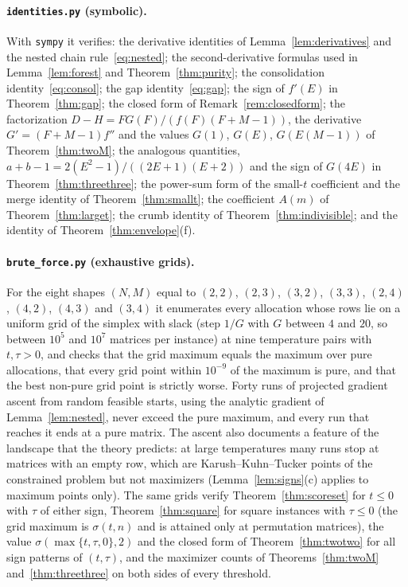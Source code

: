 \documentclass[11pt]{article}
\theoremstyle{plain}
\theoremstyle{definition}
\theoremstyle{remark}
\newcommand{\sig}{\sigma}
\begin{document}
\paragraph{\texttt{identities.py} (symbolic).}
With \texttt{sympy} it verifies: the derivative identities of Lemma~\ref{lem:derivatives} and the nested chain rule~\eqref{eq:nested}; the second-derivative formulas used in Lemma~\ref{lem:forest} and Theorem~\ref{thm:purity}; the consolidation identity~\eqref{eq:consol}; the gap identity~\eqref{eq:gap}; the sign of $f'(E)$ in Theorem~\ref{thm:gap}; the closed form of Remark~\ref{rem:closedform}; the factorization $D-H=FG(F)/(f(F)(F+M-1))$, the derivative $G'=(F+M-1)f''$ and the values $G(1)$, $G(E)$, $G(E(M-1))$ of Theorem~\ref{thm:twoM}; the analogous quantities, $a+b-1=2(E^2-1)/((2E+1)(E+2))$ and the sign of $G(4E)$ in Theorem~\ref{thm:threethree}; the power-sum form of the small-$t$ coefficient and the merge identity of Theorem~\ref{thm:smallt}; the coefficient $A(m)$ of Theorem~\ref{thm:larget}; the crumb identity of Theorem~\ref{thm:indivisible}; and the identity of Theorem~\ref{thm:envelope}(f).

\paragraph{\texttt{brute\_force.py} (exhaustive grids).}
For the eight shapes $(N,M)$ equal to $(2,2)$, $(2,3)$, $(3,2)$, $(3,3)$, $(2,4)$, $(4,2)$, $(4,3)$ and $(3,4)$ it enumerates every allocation whose rows lie on a uniform grid of the simplex with slack (step $1/G$ with $G$ between $4$ and $20$, so between $10^5$ and $10^7$ matrices per instance) at nine temperature pairs with $t,\tau>0$, and checks that the grid maximum equals the maximum over pure allocations, that every grid point within $10^{-9}$ of the maximum is pure, and that the best non-pure grid point is strictly worse. Forty runs of projected gradient ascent from random feasible starts, using the analytic gradient of Lemma~\ref{lem:nested}, never exceed the pure maximum, and every run that reaches it ends at a pure matrix. The ascent also documents a feature of the landscape that the theory predicts: at large temperatures many runs stop at matrices with an empty row, which are Karush--Kuhn--Tucker points of the constrained problem but not maximizers (Lemma~\ref{lem:signs}(c) applies to maximum points only). The same grids verify Theorem~\ref{thm:scoreset} for $t\le0$ with $\tau$ of either sign, Theorem~\ref{thm:square} for square instances with $\tau\le0$ (the grid maximum is $\sig(t,n)$ and is attained only at permutation matrices), the value $\sig(\max\{t,\tau,0\},2)$ and the closed form of Theorem~\ref{thm:twotwo} for all sign patterns of $(t,\tau)$, and the maximizer counts of Theorems~\ref{thm:twoM} and~\ref{thm:threethree} on both sides of every threshold.
\end{document}
